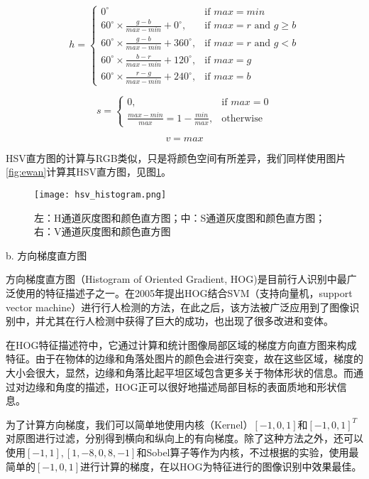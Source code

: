 $$h={\begin{cases}0^{\circ }&{\mbox{if }}max=min\\60^{\circ }\times {\frac  {g-b}{max-min}}+0^{\circ },&{\mbox{if }}max=r{\mbox{ and }}g\geq b\\60^{\circ }\times {\frac  {g-b}{max-min}}+360^{\circ },&{\mbox{if }}max=r{\mbox{ and }}g<b\\60^{\circ }\times {\frac  {b-r}{max-min}}+120^{\circ },&{\mbox{if }}max=g\\60^{\circ }\times {\frac  {r-g}{max-min}}+240^{\circ },&{\mbox{if }}max=b\end{cases}}$$

$$s={\begin{cases}0,&{\mbox{if }}max=0\\{\frac  {max-min}{max}}=1-{\frac  {min}{max}},&{\mbox{otherwise}}\end{cases}}$$

$$
v=max
$$

  HSV直方图的计算与RGB类似，只是将颜色空间有所差异，我们同样使用图片\ref{fig:ewan}计算其HSV直方图，见图\ref{fig:hsvhistogram}。

\begin{figure}[htb]
  \centering
  \texttt{[image: hsv\_histogram.png]}
  \caption{左：H通道灰度图和颜色直方图；中：S通道灰度图和颜色直方图；右：V通道灰度图和颜色直方图}
  \label{fig:hsvhistogram}
\end{figure}

  b. 方向梯度直方图

  方向梯度直方图（Histogram of Oriented Gradient, HOG)是目前行人识别中最广泛使用的特征描述子之一。\citet{dalal2005histograms}在2005年提出HOG结合SVM（支持向量机，support vector machine）进行行人检测的方法，在此之后，该方法被广泛应用到了图像识别中，并尤其在行人检测中获得了巨大的成功，也出现了很多改进和变体。

  在HOG特征描述符中，它通过计算和统计图像局部区域的梯度方向直方图来构成特征。由于在物体的边缘和角落处图片的颜色会进行突变，故在这些区域，梯度的大小会很大，显然，边缘和角落比起平坦区域包含更多关于物体形状的信息。而通过对边缘和角度的描述，HOG正可以很好地描述局部目标的表面质地和形状信息。

  为了计算方向梯度，我们可以简单地使用内核（Kernel）$[-1,0,1]$和$[-1,0,1]^{T}$对原图进行过滤，分别得到横向和纵向上的有向梯度。除了这种方法之外，还可以使用$[-1,1],[1,-8,0,8,-1]$和Sobel算子等作为内核，不过根据\citet{dalal2005histograms}的实验，使用最简单的$[-1,0,1]$进行计算的梯度，在以HOG为特征进行的图像识别中效果最佳。

